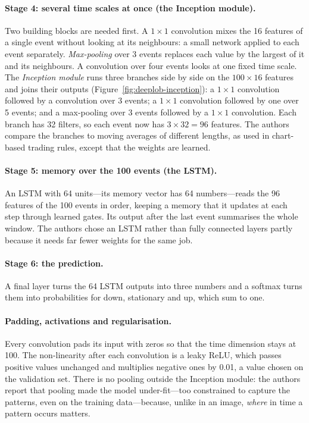 \paragraph{Stage 4: several time scales at once (the Inception module).} Two building blocks are needed first. A
$1 \times 1$ convolution mixes the 16 features of a single event without looking at its neighbours: a small network
applied to each event separately. \emph{Max-pooling} over 3 events replaces each value by the largest of it and its
neighbours. A convolution over four events looks at one fixed time scale. The \emph{Inception module} runs three branches side by side on the $100 \times 16$ features
and joins their outputs (Figure~\ref{fig:deeplob-inception}): a $1 \times 1$ convolution followed by a convolution over
3 events; a $1 \times 1$ convolution followed by one over 5 events; and a max-pooling over 3 events followed by a
$1 \times 1$ convolution. Each branch has 32 filters, so each event now has $3 \times 32 = 96$ features. The authors
compare the branches to moving averages of different lengths, as used in chart-based trading rules, except that
the weights are learned.

\paragraph{Stage 5: memory over the 100 events (the LSTM).} An LSTM with 64 units---its memory vector has 64 numbers---reads the 96 features of the 100
events in order, keeping a memory that it updates at each step through learned gates. Its output after the last
event summarises the whole window. The authors chose an LSTM rather than fully connected layers partly because it
needs far fewer weights for the same job.

\paragraph{Stage 6: the prediction.} A final layer turns the 64 LSTM outputs into three numbers and a softmax turns
them into probabilities for down, stationary and up, which sum to one.

\paragraph{Padding, activations and regularisation.} Every convolution pads its input with zeros so that the time dimension stays at
100. The non-linearity after each convolution is a leaky ReLU, which passes positive values unchanged and multiplies
negative ones by 0.01, a value chosen on the validation set. There is no pooling outside the Inception module: the
authors report that pooling made the model under-fit---too constrained to capture the patterns, even on the
training data---because, unlike in an image, \emph{where} in time a pattern
occurs matters.

